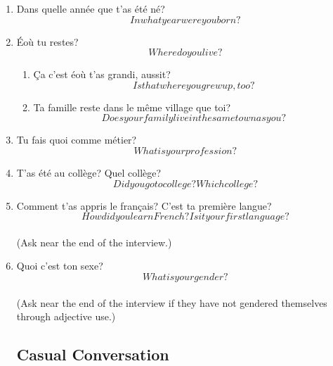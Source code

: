 
\ifdefined \longtrans
\else
  \newcommand{\longtrans}[1]{\[#1\]}
\fi

\begin{enumerate}
  \subsection{Demographics}
    \item Dans quelle année que t'as été né?\\
      \longtrans{In what year were you born?}
    \item Éoù tu restes?\\
      \longtrans{Where do you live?}
    \begin{enumerate}
      \item Ça c'est éoù t'as grandi, aussit?\\
        \longtrans{Is that where you grew up, too?}
      \item Ta famille reste dans le même village que toi?\\
        \longtrans{Does your family live in the same town as you?}
    \end{enumerate}
    \item Tu fais quoi comme métier?\\
      \longtrans{What is your profession?}
    \item T'as été au collège? Quel collège?\\
      \longtrans{Did you go to college? Which college?}
    \item Comment t'as appris le français? C'est ta première langue?\\
      \longtrans{How did you learn French? Is it your first language?}\\
      (Ask near the end of the interview.)
    \item Quoi c'est ton sexe?\\
      \longtrans{What is your gender?}\\
      (Ask near the end of the interview if they have not gendered themselves through adjective use.)
  \subsection{Casual Conversation}

\end{enumerate}
